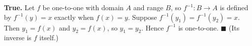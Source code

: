 \textbf{True.} Let $f$ be one-to-one with domain $A$ and range $B$, so $f^{-1}:B\to A$ is defined by $f^{-1}(y)=x$ exactly when $f(x)=y$. Suppose $f^{-1}(y_1)=f^{-1}(y_2)=x$. Then $y_1=f(x)$ and $y_2=f(x)$, so $y_1=y_2$. Hence $f^{-1}$ is one-to-one. $\blacksquare$ (Its inverse is $f$ itself.)
